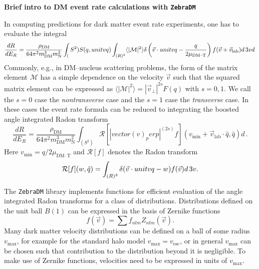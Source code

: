 \documentclass{article}
\newcommand{\der}[2]{\frac{d#1}{d#2}}
\newcommand{\unitv}[1]{\hat{#1}}
\newcommand{\mean}[1]{\langle #1 \rangle}
\newcommand{\difd}[1]{d\,}
\begin{document}
\begin{center}
\large\textbf{Brief intro to DM event rate calculations with \texttt{ZebraDM}}
\end{center}

In computing predictions for dark matter event rate experiments, one has to evaluate the integral
\begin{equation}
\der{R}{E_R} = \frac{\rho_\text{DM}}{64\pi^2m_\text{DM}^3m_\text{N}^2}\int_(S^2)S(q, unitv{q})\int_{\mathbb(R)^3}\mean{|\mathcal{M}|^2} \delta\left(\vec{v}\cdot unitv{q}-\frac{q}{2\mu_\text{DM--T}}\right)f(\vec{v}+\vec{v}_\text{lab})\difd^3v \difd\Omega
\end{equation}
Commonly, e.g., in DM--nucleus scattering problems, the form of the matrix element $\mathcal{M}$ has a simple dependence on the velocity $\vec{v}$ such that the squared matrix element can be expressed as $\mean{|\mathcal{M}|^2}=|\vec{v}_\perp|^{2s}F(q)$ with $s=0,1$. We call the $s=0$ case the \emph{nontransverse} case and the $s=1$ case the \emph{transverse} case. In these cases the event rate formula can be reduced to integrating the boosted angle integrated Radon transform
\begin{equation}
\der{R}{E_R} = \frac{\rho_\text{DM}}{64\pi^2m_\text{DM}^3m_\text{N}^2}\int_(S^2)\mathcal{R}[|vector(v)_perp|^(2s)f](v_\text{min}+\vec{v}_\text{lab}\cdot\unitv{q}, \unitv{q})\difd\Omega.
\end{equation}
Here $v_\text{min}=q/2\mu_\text{DM--T}$ and $\mathcal{R}[f]$ denotes the Radon transform
\begin{equation}
\mathcal{R}[f](w, \unitv{q})=\int_{\mathbb(R)^3}\delta(\vec{v}\cdot unitv{q}-w)f(\vec{v})\difd^3v.
\end{equation}

The \texttt{ZebraDM} library implements functions for efficient evaluation of the angle integrated Radon transforms for a class of distributions. Distributions defined on the unit ball $B(1)$ can be expressed in the basis of Zernike functions
\begin{equation}
f(\vec{v})=\sum f_{nlm}Z_{nlm}(\vec{v}).
\end{equation}
Many dark matter velocity distributions can be defined on a ball of some radius $v_\text{max}$, for example for the standard halo model $v_\text{max}=v_\text{esc}$, or in general $v_\text{max}$ can be chosen such that contribution to the distribution beyond it is negligible. To make use of Zernike functions, velocities need to be expressed in units of $v_\text{max}$.
\end{document}
